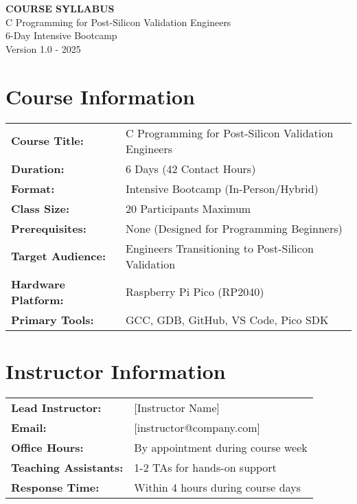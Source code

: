 \documentclass[11pt,a4paper]{article}
\begin{document}
\begin{center}
    {\Huge\bfseries\color{courseblue} COURSE SYLLABUS}\\[0.5cm]
    {\Large C Programming for Post-Silicon Validation Engineers}\\[0.3cm]
    {\large 6-Day Intensive Bootcamp}\\[0.2cm]
    {\normalsize Version 1.0 - 2025}
\end{center}

\vspace{1cm}

\section{Course Information}

\begin{tabular}{ll}
\textbf{Course Title:} & C Programming for Post-Silicon Validation Engineers \\
\textbf{Duration:} & 6 Days (42 Contact Hours) \\
\textbf{Format:} & Intensive Bootcamp (In-Person/Hybrid) \\
\textbf{Class Size:} & 20 Participants Maximum \\
\textbf{Prerequisites:} & None (Designed for Programming Beginners) \\
\textbf{Target Audience:} & Engineers Transitioning to Post-Silicon Validation \\
\textbf{Hardware Platform:} & Raspberry Pi Pico (RP2040) \\
\textbf{Primary Tools:} & GCC, GDB, GitHub, VS Code, Pico SDK \\
\end{tabular}

\section{Instructor Information}

\begin{tabular}{ll}
\textbf{Lead Instructor:} & [Instructor Name] \\
\textbf{Email:} & [instructor@company.com] \\
\textbf{Office Hours:} & By appointment during course week \\
\textbf{Teaching Assistants:} & 1-2 TAs for hands-on support \\
\textbf{Response Time:} & Within 4 hours during course days \\
\end{tabular}
\end{document}
